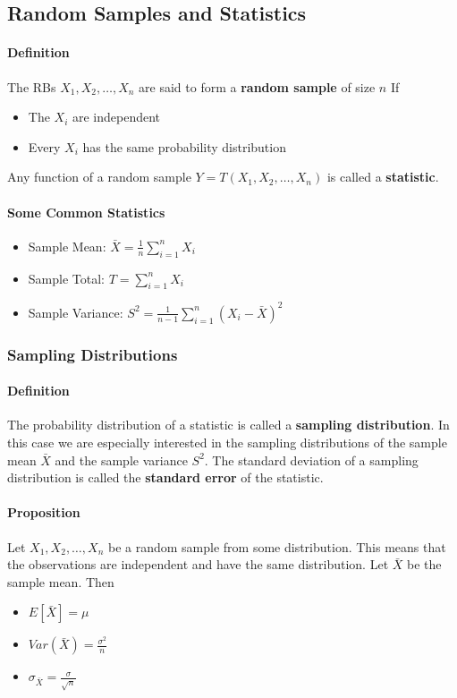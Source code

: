 \subsection{Random Samples and Statistics}
\hrulefill

\paragraph{Definition}
The RBs \(X_1, X_2, \ldots, X_n\) are said to form a \textbf{random sample} of size \(n\) If
\begin{itemize}
    \item The \(X_i\) are independent
    \item Every \(X_i\) has the same probability distribution
\end{itemize}
Any function of a random sample \(Y = T(X_1, X_2, \ldots, X_n)\) is called a \textbf{statistic}.

\paragraph{Some Common Statistics}
\begin{itemize}
    \item Sample Mean: \(\bar{X} = \frac{1}{n} \sum_{i=1}^n X_i\)
    \item Sample Total: \(T = \sum_{i=1}^n X_i\)
    \item Sample Variance: \(S^2 = \frac{1}{n-1} \sum_{i=1}^n (X_i - \bar{X})^2\)
\end{itemize}

\subsubsection*{Sampling Distributions}
\paragraph*{Definition}
The probability distribution of a statistic is called a \textbf{sampling distribution}. In this case we are 
especially interested in the sampling distributions of the sample mean \(\bar{X}\) and the sample variance 
\(S^2\). The standard deviation of a sampling distribution is called the \textbf{standard error} of the statistic.

\paragraph*{Proposition}
Let \(X_1, X_2, \ldots, X_n\) be a random sample from some distribution. This means that the observations
are independent and have the same distribution. Let \(\bar{X}\) be the sample mean. Then
\begin{itemize}
    \item $E[\bar{X}] = \mu$
    \item $Var(\bar{X}) = \frac{\sigma^2}{n}$
    \item $\sigma_{\bar{X}} = \frac{\sigma}{\sqrt{n}}$
\end{itemize}

